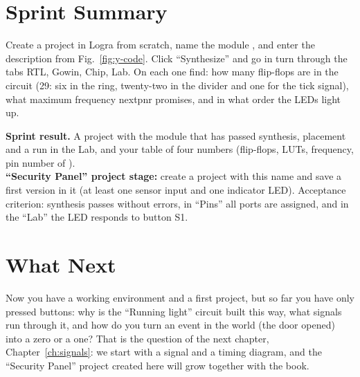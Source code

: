 \section{Sprint Summary}

\begin{taskbox}[Task]
Create a project in Logra from scratch, name the module , and enter the
description from Fig.~\ref{fig:y-code}. Click ``Synthesize'' and go in turn
through the tabs RTL, Gowin, Chip, Lab. On each one find:
how many flip-flops are in the circuit (29: six in the ring, twenty-two in the divider and one for the tick signal),
what maximum frequency nextpnr promises, and in what order the
LEDs light up.
\end{taskbox}

\begin{diybox}
\textbf{Sprint result.} A project with the module  that has passed synthesis,
placement and a run in the Lab, and your table of four numbers
(flip-flops, LUTs, frequency, pin number of ).\\
 \textbf{``Security Panel'' project stage:} create a project with this
name and save a first version in it (at least one sensor input and one
indicator LED). Acceptance criterion: synthesis passes without errors, in
``Pins'' all ports are assigned, and in the ``Lab'' the LED responds to button S1.
\end{diybox}

\section{What Next}

Now you have a working environment and a first project, but so far you have
only pressed buttons: why is the ``Running light'' circuit built this way, what
signals run through it, and how do you turn an event in the world (the door
opened) into a zero or a one? That is the question of the next chapter,
Chapter~\ref{ch:signals}: we start with a signal and a timing diagram, and the
``Security Panel'' project created here will grow together with the book.
